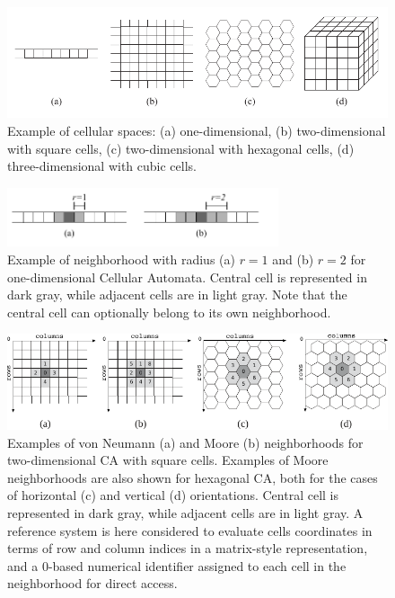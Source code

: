 \begin{figure}
  \begin{center}
    \includegraphics[width=11.5cm]{./images/CellularAutomata/cellularspaces.pdf}
    \caption{Example of cellular spaces: (a) one-dimensional, (b)
      two-dimensional with square cells, (c) two-dimensional with
      hexagonal cells, (d) three-dimensional with cubic cells.}
    \label{fig:cellularspaces}
  \end{center}
\end{figure}

\begin{figure}
  \begin{center}
    \includegraphics[width=8cm]{./images/CellularAutomata/onedimensional.pdf}
    \caption{Example of neighborhood with radius (a) $r = 1$ and (b) $r
      = 2$ for one-dimensional Cellular Automata. Central cell is
      represented in dark gray, while adjacent cells are in light
      gray. Note that the central cell can optionally belong to its own
      neighborhood.}
    \label{fig:1Dneighborhood}
  \end{center}
\end{figure}

\begin{figure}
  \begin{center}
    \includegraphics[width=11.5cm]{./images/CellularAutomata/2Dneighborhoods.pdf}
    \caption{Examples of von Neumann (a) and Moore (b) neighborhoods
      for two-dimensional CA with square cells. Examples of Moore
      neighborhoods are also shown for hexagonal CA, both for the
      cases of horizontal (c) and vertical (d) orientations. Central
      cell is represented in dark gray, while adjacent cells are in
      light gray. A reference system is here considered to evaluate
      cells coordinates in terms of row and column indices in a
      matrix-style representation, and a 0-based numerical identifier
      assigned to each cell in the neighborhood for direct
      access.}
    \label{fig:2Dneighborhood}
  \end{center}
\end{figure}

